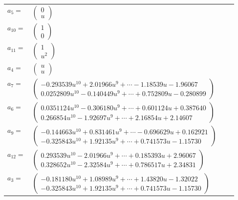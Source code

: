 \documentclass[1p]{elsarticle_modified}
\theoremstyle{definition}
\begin{document}
\begin{tabular}{m{7pt} m{180pt} m{7pt} m{180pt} }
\flushright $a_{5}=$&$\begin{pmatrix}0\\u\end{pmatrix}$ \\
\flushright $a_{10}=$&$\begin{pmatrix}1\\0\end{pmatrix}$ \\
\flushright $a_{11}=$&$\begin{pmatrix}1\\u^2\end{pmatrix}$ \\
\flushright $a_{4}=$&$\begin{pmatrix}u\\u\end{pmatrix}$ \\
\flushright $a_{7}=$&$\begin{pmatrix}-0.293539 u^{10}+2.01966 u^{9}+\cdots-1.18539 u-1.96067\\0.0252809 u^{10}-0.140449 u^{9}+\cdots+0.752809 u-0.280899\end{pmatrix}$ \\
\flushright $a_{6}=$&$\begin{pmatrix}0.0351124 u^{10}-0.306180 u^{9}+\cdots+0.601124 u+0.387640\\0.266854 u^{10}-1.92697 u^{9}+\cdots+2.16854 u+2.14607\end{pmatrix}$ \\
\flushright $a_{9}=$&$\begin{pmatrix}-0.144663 u^{10}+0.831461 u^{9}+\cdots-0.696629 u+0.162921\\-0.325843 u^{10}+1.92135 u^{9}+\cdots+0.741573 u-1.15730\end{pmatrix}$ \\
\flushright $a_{12}=$&$\begin{pmatrix}0.293539 u^{10}-2.01966 u^{9}+\cdots+0.185393 u+2.96067\\0.328652 u^{10}-2.32584 u^{9}+\cdots+0.786517 u+2.34831\end{pmatrix}$ \\
\flushright $a_{3}=$&$\begin{pmatrix}-0.181180 u^{10}+1.08989 u^{9}+\cdots+1.43820 u-1.32022\\-0.325843 u^{10}+1.92135 u^{9}+\cdots+0.741573 u-1.15730\end{pmatrix}$ \\

\end{tabular}
\end{document}
